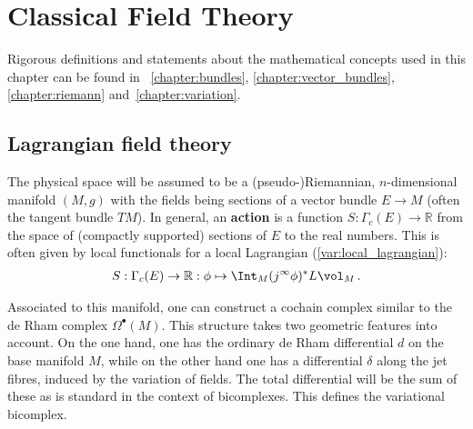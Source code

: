 \chapter{Classical Field Theory}\label{chapter:classical_fields}

    Rigorous definitions and statements about the mathematical concepts used in this chapter can be found in ~\ref{chapter:bundles}, \ref{chapter:vector_bundles}, \ref{chapter:riemann} and~\ref{chapter:variation}.

\section{Lagrangian field theory}

    The physical space will be assumed to be a (pseudo-)Riemannian, $n$-dimensional manifold $(M,g)$ with the fields being sections of a vector bundle $E\rightarrow M$ (often the tangent bundle $TM$). In general, an \textbf{action} is a function $S:\Gamma_c(E)\rightarrow\mathbb{R}$ from the space of (compactly supported) sections of $E$ to the real numbers. This is often given by local functionals for a local Lagrangian (\cref{var:local_lagrangian}):
    \begin{gather}
        S:\Gamma_c(E)\rightarrow\mathbb{R}:\phi\mapsto\Int_M(j^\infty\phi)^*L\vol_M\,.
    \end{gather}

    Associated to this manifold, one can construct a cochain complex similar to the de Rham complex $\Omega^\bullet(M)$. This structure takes two geometric features into account. On the one hand, one has the ordinary de Rham differential $d$ on the base manifold $M$, while on the other hand one has a differential $\delta$ along the jet fibres, induced by the variation of fields. The total differential will be the sum of these as is standard in the context of bicomplexes. This defines the variational bicomplex.

